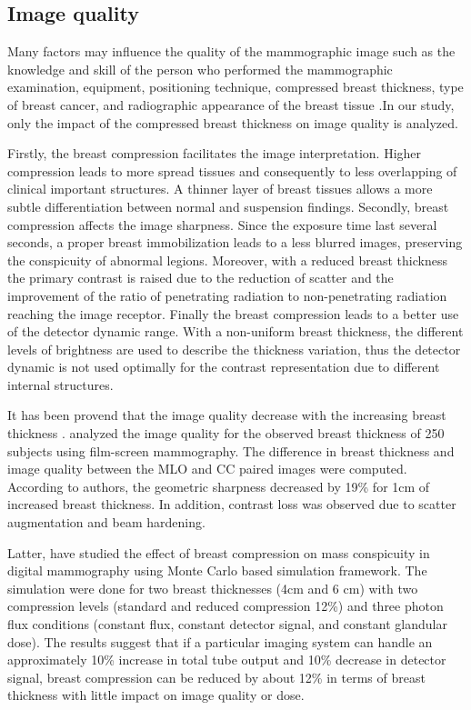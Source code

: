 \subsection{Image quality}

Many factors may influence the quality of the mammographic image such as the knowledge and skill of the person who performed the mammographic examination, equipment, positioning
technique, compressed breast thickness, type of breast
cancer, and radiographic appearance of the breast tissue \citep{de_pain_2015,andolina2011mammographic}.In our study, only the impact of the compressed breast thickness on image quality is analyzed.

 Firstly, the breast compression facilitates the image interpretation. Higher compression leads to more spread tissues and  consequently to less overlapping of clinical important structures. A thinner layer of breast tissues allows a more subtle differentiation between normal and suspension findings. Secondly, breast compression affects the image sharpness. Since the exposure time last several seconds, a proper breast immobilization leads to a less blurred images, preserving the conspicuity of abnormal legions. Moreover, with a reduced breast thickness the primary contrast is raised due to the reduction of scatter and the improvement of the ratio of penetrating radiation to non-penetrating radiation reaching the image receptor. Finally the breast compression leads to a better use of the detector dynamic range. With a non-uniform breast thickness, the different levels of brightness are used to describe the thickness variation, thus the detector dynamic is not used optimally for the contrast representation due to different  internal structures.

It has been provend that the image quality decrease with the increasing breast thickness \citep{ko_dose_2013,helvie_breast_1994,saunders_effect_2008,poulos_breast_2003}. \cite{helvie_breast_1994} analyzed  the image quality for the observed breast thickness of 250 subjects using film-screen mammography.  The difference in breast thickness and image quality between the MLO and CC paired images were computed. According to authors,  the geometric sharpness decreased by 19\% for 1cm of increased breast thickness. In addition, contrast loss was observed due to scatter augmentation and beam hardening.

Latter, \cite{saunders_effect_2008} have studied the effect of breast compression on mass conspicuity in digital mammography using Monte Carlo based simulation framework. The simulation were done for two breast thicknesses (4cm and 6 cm) with two compression levels (standard and reduced compression 12\%) and three photon flux conditions (constant
flux, constant detector signal, and constant glandular dose). The results suggest that if a particular imaging system can handle an approximately 10\% increase in total tube output and 10\% decrease in detector signal, breast compression can be reduced by about 12\% in terms of breast thickness with little impact on image quality or dose.

